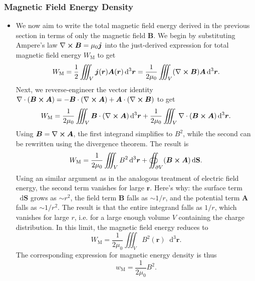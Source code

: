\documentclass[11pt, a4paper]{article}
\newcommand{\diff}{\mathop{}\!\mathrm{d}} %
\newcommand{\dr}{\diff^{3} \r}  %
\renewcommand{\vec}[1]{\bm{#1}} %
\renewcommand{\r}{\vec{r}}
\newcommand{\B}{\vec{B}} %
\newcommand{\A}{\vec{A}} %
\renewcommand{\S}{\mathbf{S}}  %
\newcommand{\mm}{\mu_{0}}  %
\renewcommand{\j}{\vec{j}}  %
\renewcommand{\div}{\nabla \cdot}
\renewcommand{\curl}{\nabla \cross}
\begin{document}
\subsubsection{Magnetic Field Energy Density}
\begin{itemize}
    \item We now aim to write the total magnetic field energy derived in the previous section in terms of only the magnetic field $ \B $. We begin by substituting Ampere's law $ \curl \B = \mm \j $ into the just-derived expression for total magnetic field energy $ W_{\text{M}} $ to get
    \begin{equation*}
        W_{\text{M}} = \frac{1}{2} \iiint_{V} \j(\r) \A(\r) \dr = \frac{1}{2\mm}\iiint_{V}(\curl \B) \A \dr.
    \end{equation*}
    Next, we reverse-engineer the vector identity $ \div (\B \cross \A) = - \B \cdot (\curl \A) + \A \cdot (\curl \B) $ to get
    \begin{equation*}
        W_{\text{M}} = \frac{1}{2\mm} \iiint_{V} \B \cdot (\curl \A)\dr + \frac{1}{2\mm} \iiint_{V} \div (\B \cross \A) \dr.
    \end{equation*}
    Using $ \B = \curl \A $, the first integrand simplifies to $ B^{2} $, while the second can be rewritten using the divergence theorem. The result is
    \begin{equation*}
        W_{\text{M}} = \frac{1}{2\mm} \iiint_{V} B^{2} \dr + \oiint_{\partial V} (\B \cross \A) \diff \S.
    \end{equation*}
    Using an similar argument as in the analogous treatment of electric field energy, the second term vanishes for large $ \r $. Here's why: the surface term $ \diff \S $ grows as $ \sim r^{2} $, the field term $ \B $ falls as $ \sim 1/r $, and the potential term $ \A $ falls as $ \sim 1/r^{2} $. The result is that the entire integrand falls as $ 1/r $, which vanishes for large $ r $, i.e. for a large enough volume $ V $ containing the charge distribution. In this limit, the magnetic field energy reduces to
    \begin{equation*}
        W_{\text{M}} = \frac{1}{2\mm} \iiint_{V}B^{2}(\r)\dr.
    \end{equation*}
    The corresponding expression for magnetic energy density is thus
    \begin{equation*}
        w_{\text{M}} = \frac{1}{2\mm} B^{2}.
    \end{equation*}
    
    
\end{itemize}
\end{document}
